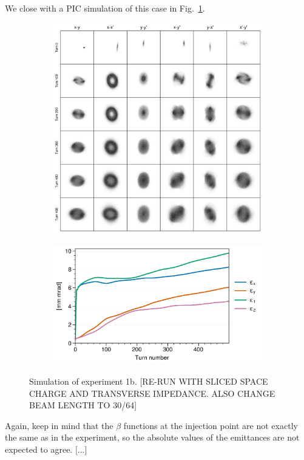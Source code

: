 We close with a PIC simulation of this case in Fig.~\ref{fig:exp1b_sim}. 
%
\begin{figure}[!p]
    \centering
    \begin{subfigure}{0.85\textwidth}
        \includegraphics[width=\textwidth]{Images/chapter5/exp1b/sim_snapshots.png}
    \end{subfigure}
    \vfill
    \vspace*{1.0cm}
    \vfill
    \begin{subfigure}{0.7\textwidth}
        \includegraphics[width=\textwidth]{Images/chapter5/exp1b/sim_emittances.png}
    \end{subfigure}
    \caption{Simulation of experiment 1b. [RE-RUN WITH SLICED SPACE CHARGE AND TRANSVERSE IMPEDANCE. ALSO CHANGE BEAM LENGTH TO 30/64]}
    \label{fig:exp1b_sim}
\end{figure}
%
Again, keep in mind that the $\beta$ functions at the injection point are not exactly the same as in the experiment, so the absolute values of the emittances are not expected to agree. [...]




